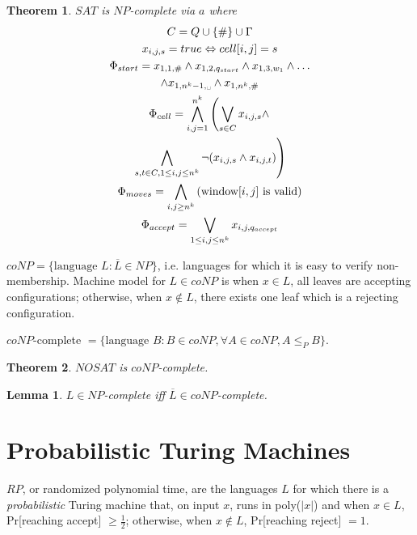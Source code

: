 \documentclass[letterpaper,landscape,11pt]{article}
\newtheorem{theorem}{Theorem}
\newtheorem{lemma}{Lemma}
\begin{document}
\begin{theorem}
	$SAT$ is $NP$-complete via $a$ where
	\begin{gather*}
		C = Q \cup \{\#\} \cup \Gamma \\
		x_{i, j, s} = true \Leftrightarrow cell[i, j] = s \\
		\Phi_{start} = x_{1, 1, \#} \land x_{1, 2, q_{start}} \land x_{1, 3, w_1} \land \dots \\
		\land x_{1, n^k-1, \text{\textvisiblespace}} \land x_{1, n^k, \#} \\
		\Phi_{cell} = \bigwedge\limits_{i, j = 1}^{n^k} \left(\bigvee\limits_{s \in C} x_{i, j, s} \land \right. \\
		\left. \bigwedge\limits_{s, t \in C, 1 \leq i, j \leq n^k} \lnot (x_{i, j, s} \land x_{i, j, t})\right) \\
		\Phi_{moves} = \bigwedge\limits_{i, j \geq n^k} \text{(window}[i, j] \text{ is valid)} \\
		\Phi_{accept} = \bigvee\limits_{1 \leq i, j \leq n^k} x_{i, j, q_{accept}}
	\end{gather*}
\end{theorem}

$coNP = \{\text{language } L : \overline{L} \in NP\}$, i.e. languages for which it is easy to verify non-membership. Machine model for $L \in coNP$ is when $x \in L$, all leaves are accepting configurations; otherwise, when $x \notin L$, there exists one leaf which is a rejecting configuration.

$coNP$-complete $ = \{\text{language } B : B \in coNP, \forall A \in coNP, A \leq_P B\}$.

\begin{theorem}
	$NOSAT$ is $coNP$-complete.
\end{theorem}

\begin{lemma}
	$L \in NP$-complete iff $\overline{L} \in coNP$-complete.
\end{lemma}

\section{Probabilistic Turing Machines}

$RP$, or randomized polynomial time, are the languages $L$ for which there is a \emph{probabilistic} Turing machine that, on input $x$, runs in poly($|x|$) and when $x \in L$, Pr[reaching accept] $\geq \frac{1}{2}$; otherwise, when $x \notin L$, Pr[reaching reject] $ = 1$.
\end{document}
